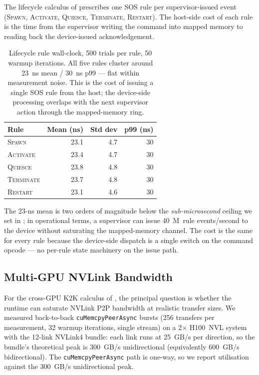 The lifecycle calculus of  prescribes one
SOS rule per supervisor-issued event (\textsc{Spawn}, \textsc{Activate},
\textsc{Quiesce}, \textsc{Terminate}, \textsc{Restart}).  The
host-side cost of each rule is the time from the supervisor writing
the command into mapped memory to reading back the device-issued
acknowledgement.

\begin{table}[htbp]
\centering
\begin{tabular}{lrrr}
\toprule
Rule & Mean (ns) & Std dev & p99 (ns) \\
\midrule
\textsc{Spawn}     & 23.1 & 4.7 & 30 \\
\textsc{Activate}  & 23.4 & 4.7 & 30 \\
\textsc{Quiesce}   & 23.8 & 4.8 & 30 \\
\textsc{Terminate} & 23.7 & 4.8 & 30 \\
\textsc{Restart}   & 23.1 & 4.6 & 30 \\
\bottomrule
\end{tabular}
\caption{Lifecycle rule wall-clock, 500 trials per rule, 50
warmup iterations.  All five rules cluster around 23~ns mean /
30~ns p99 — flat within measurement noise.  This is the cost
of issuing a single SOS rule from the host; the device-side
processing overlaps with the next supervisor action through the
mapped-memory ring.}
\label{tab:lifecycle}
\end{table}

The 23-ns mean is two orders of magnitude below the
\emph{sub-microsecond} ceiling we set in ; in
operational terms, a supervisor can issue 40~M~rule events/second
to the device without saturating the mapped-memory channel.  The
cost is the same for every rule because the device-side dispatch
is a single switch on the command opcode — no per-rule state
machinery on the issue path.

\subsection{Multi-GPU NVLink Bandwidth}
\label{sec:eval:mgpu-bw}

For the cross-GPU K2K calculus of ,
the principal question is whether the runtime can saturate NVLink
P2P bandwidth at realistic transfer sizes.  We measured back-to-back
\texttt{cuMemcpyPeerAsync} bursts (256 transfers per measurement,
32 warmup iterations, single stream) on a 2$\times$ H100~NVL
system with the 12-link NVLink4 bundle: each link runs at 25~GB/s
per direction, so the bundle's theoretical peak is 300~GB/s
unidirectional (equivalently 600~GB/s bidirectional).  The
\texttt{cuMemcpyPeerAsync} path is one-way, so we report
utilisation against the 300~GB/s unidirectional peak.

